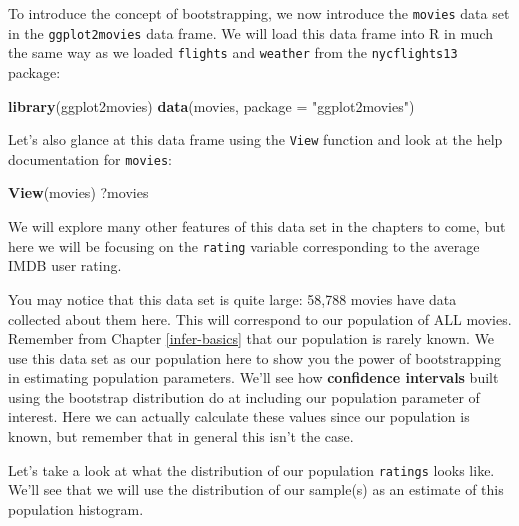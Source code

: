 \documentclass[]{tufte-book}
\newenvironment{Shaded}{\begin{snugshade}}{\end{snugshade}}
\newcommand{\KeywordTok}[1]{\textcolor[rgb]{0.13,0.29,0.53}{\textbf{{#1}}}}
\newcommand{\DataTypeTok}[1]{\textcolor[rgb]{0.13,0.29,0.53}{{#1}}}
\newcommand{\DecValTok}[1]{\textcolor[rgb]{0.00,0.00,0.81}{{#1}}}
\newcommand{\StringTok}[1]{\textcolor[rgb]{0.31,0.60,0.02}{{#1}}}
\newcommand{\NormalTok}[1]{{#1}}
\begin{document}
To introduce the concept of bootstrapping, we now introduce the
\texttt{movies} data set in the \texttt{ggplot2movies} data frame. We
will load this data frame into R in much the same way as we loaded
\texttt{flights} and \texttt{weather} from the \texttt{nycflights13}
package:

\begin{Shaded}
\begin{Highlighting}[]
\KeywordTok{library}\NormalTok{(ggplot2movies)}
\KeywordTok{data}\NormalTok{(movies, }\DataTypeTok{package =} \StringTok{"ggplot2movies"}\NormalTok{)}
\end{Highlighting}
\end{Shaded}

Let's also glance at this data frame using the \texttt{View} function
and look at the help documentation for \texttt{movies}:

\begin{Shaded}
\begin{Highlighting}[]
\KeywordTok{View}\NormalTok{(movies)}
\NormalTok{?movies}
\end{Highlighting}
\end{Shaded}

We will explore many other features of this data set in the chapters to
come, but here we will be focusing on the \texttt{rating} variable
corresponding to the average IMDB user rating.

You may notice that this data set is quite large: 58,788 movies have
data collected about them here. This will correspond to our population
of ALL movies. Remember from Chapter \ref{infer-basics} that our
population is rarely known. We use this data set as our population here
to show you the power of bootstrapping in estimating population
parameters. We'll see how \textbf{confidence intervals} built using the
bootstrap distribution do at including our population parameter of
interest. Here we can actually calculate these values since our
population is known, but remember that in general this isn't the case.

Let's take a look at what the distribution of our population
\texttt{ratings} looks like. We'll see that we will use the distribution
of our sample(s) as an estimate of this population histogram.

\begin{Shaded}
\end{Shaded}
\end{document}
